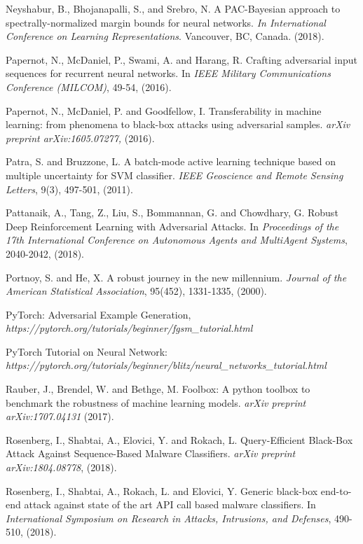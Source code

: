 \documentclass[12pt]{article}
\begin{document}
\begin{thebibliography}{}
Neyshabur, B., Bhojanapalli, S., and Srebro, N.  A PAC-Bayesian
approach to spectrally-normalized margin bounds for neural
networks. {\it In International
Conference on Learning Representations}. Vancouver, BC, Canada. (2018).

Papernot, N., McDaniel, P., Swami, A. and Harang, R. Crafting
adversarial input sequences for recurrent neural 
networks. In {\it IEEE Military Communications Conference (MILCOM)},
49-54, (2016).   

  Papernot, N., McDaniel, P. and Goodfellow, I. Transferability
  in machine learning: from phenomena to black-box attacks using
  adversarial samples. {\it arXiv preprint arXiv:1605.07277,} (2016). 

Patra, S. and Bruzzone, L. A batch-mode active learning
technique based on multiple uncertainty for SVM classifier. {\it IEEE
Geoscience and Remote Sensing Letters}, 9(3), 497-501, (2011).

  Pattanaik, A., Tang, Z., Liu, S., Bommannan, G. and Chowdhary, G.
  Robust Deep Reinforcement Learning with Adversarial
Attacks. In {\it Proceedings of the 17th International Conference on
Autonomous Agents and MultiAgent Systems}, 2040-2042, (2018).    

Portnoy, S. and He, X. A robust journey in the new millennium. {\it Journal
of the American Statistical Association}, 95(452), 1331-1335,
(2000). 

PyTorch: Adversarial Example Generation, {\it https://pytorch.org/tutorials/beginner/fgsm\_tutorial.html}

PyTorch Tutorial on Neural Network: 
{\it https://pytorch.org/tutorials/beginner/blitz/neural\_networks\_tutorial.html}  

Rauber, J., Brendel, W. and Bethge, M. Foolbox: A python toolbox to
benchmark the robustness of machine learning models. {\it arXiv
  preprint arXiv:1707.04131} (2017).

  Rosenberg, I., Shabtai, A., Elovici, Y. and Rokach, L.
  Query-Efficient Black-Box Attack Against Sequence-Based Malware
 Classifiers. {\it arXiv preprint arXiv:1804.08778}, (2018).  

 Rosenberg, I., Shabtai, A., Rokach, L. and Elovici, Y. Generic
 black-box end-to-end attack against state of the art API call based
 malware classifiers. In {\it International Symposium on Research in
 Attacks, Intrusions, and Defenses}, 490-510, (2018). 


\end{thebibliography}
\end{document}
